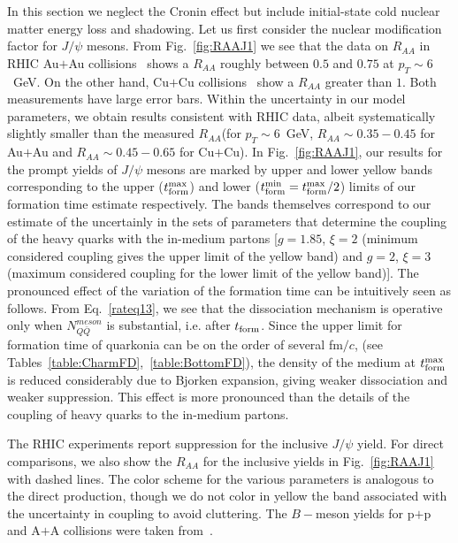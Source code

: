 \documentclass[article,showpacs,preprintnumbers,amsmath,amssymb]{revtex4}
\newcommand{\rf}{{\rm form}}
\begin{document}
In this section we neglect the Cronin effect but include initial-state
cold nuclear matter energy loss and  shadowing. Let us first 
consider the nuclear modification factor for $J/\psi$ mesons. From
Fig.~\ref{fig:RAAJ1} we see that the data on $R_{AA}$ in RHIC Au$+$Au
collisions~\cite{Tang:2011kr} shows a $R_{AA}$ roughly between $0.5$ and $0.75$
at $p_T\sim6$~GeV. On the other hand,  Cu$+$Cu collisions~\cite{Abelev:2009qaa}
show a $R_{AA}$ greater than $1$. Both measurements have large error bars.
Within the uncertainty in our model parameters, we obtain results consistent
with RHIC data, albeit systematically slightly smaller than the measured
$R_{AA}$(for $p_T\sim 6$~GeV, $R_{AA}\sim 0.35-0.45$ for Au$+$Au and $R_{AA}
\sim 0.45-0.65$ for Cu$+$Cu). In Fig.~\ref{fig:RAAJ1}, our results for the
prompt yields of $J/\psi$ mesons are marked by upper and lower yellow bands
corresponding to the  upper ($t_\rf^{\rm max}$) and lower ($t_\rf^{\rm
min}=t_\rf^{\rm max}/2$) limits of our formation time estimate respectively.
The bands themselves correspond to our estimate of the uncertainly in the sets
of parameters that determine the coupling of the heavy quarks with the
in-medium partons [$g=1.85$, $\xi=2$ (minimum considered coupling gives the
upper limit of the yellow band) and $g=2$, $\xi=3$ (maximum considered coupling
for the lower limit of the yellow band)]. The pronounced effect of the
variation of the formation time can be intuitively seen as follows. From
Eq.~\ref{rateq13}, we see that the dissociation mechanism is operative only
when $N^{meson}_{Q\bar{Q}}$ is substantial, i.e. after $t_\rf$.  Since the
upper limit for formation time  of quarkonia can be on the order of several
fm$/c$, (see Tables~\ref{table:CharmFD},~\ref{table:BottomFD}), the density of
the medium at $t_\rf^{\rm max}$ is reduced considerably due to Bjorken
expansion, giving weaker dissociation and weaker suppression. This effect is
more pronounced than the details of the coupling of heavy quarks to the
in-medium partons. 

The RHIC experiments report suppression for the inclusive $J/\psi$ yield. For direct
comparisons, we also show the $R_{AA}$ for the inclusive yields in
Fig.~\ref{fig:RAAJ1} with dashed lines. The color scheme for the various
parameters is analogous to the direct production, though we do not color in
yellow the band associated with the uncertainty in coupling to avoid 
cluttering. The $B-$meson yields for p$+$p and A$+$A collisions were taken
from~\cite{Sharma:2009hn}.
\end{document}
